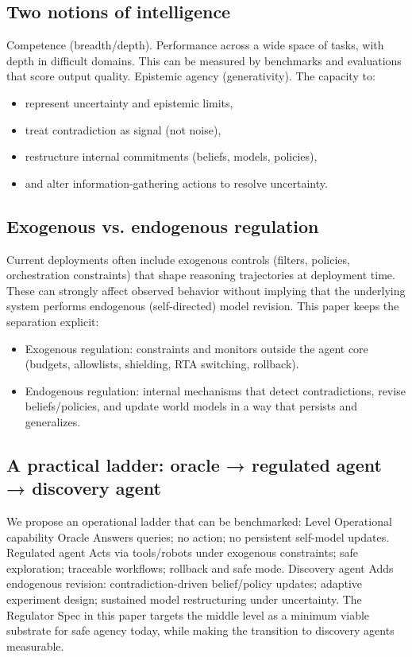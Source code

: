 \documentclass[11pt]{article}
\begin{document}
\subsection{Two notions of intelligence}
Competence (breadth/depth). Performance across a wide space of tasks, with depth in difficult
domains. This can be measured by benchmarks and evaluations that score output quality.
Epistemic agency (generativity). The capacity to:
\begin{itemize}
\item 
represent uncertainty and epistemic limits,
\item 
treat contradiction as signal (not noise),
\item 
restructure internal commitments (beliefs, models, policies),
\item 
and alter information-gathering actions to resolve uncertainty.
\end{itemize}
\subsection{Exogenous vs. endogenous regulation}
Current deployments often include exogenous controls (filters, policies, orchestration constraints)
that shape reasoning trajectories at deployment time. These can strongly affect observed behavior
without implying that the underlying system performs endogenous (self-directed) model revision.
This paper keeps the separation explicit:
\begin{itemize}
\item 
Exogenous regulation: constraints and monitors outside the agent core (budgets, allowlists,
shielding, RTA switching, rollback).
\item 
Endogenous regulation: internal mechanisms that detect contradictions, revise beliefs/policies,
and update world models in a way that persists and generalizes.
\end{itemize}
\subsection{A practical ladder: oracle → regulated agent → discovery agent}
We propose an operational ladder that can be benchmarked:
Level Operational capability
Oracle Answers queries; no action; no persistent self-model updates.
Regulated agent Acts via tools/robots under exogenous constraints; safe exploration; traceable
workflows; rollback and safe mode.
Discovery agent Adds endogenous revision: contradiction-driven belief/policy updates; adaptive experiment design; sustained model restructuring under uncertainty.
The Regulator Spec in this paper targets the middle level as a minimum viable substrate for
safe agency today, while making the transition to discovery agents measurable.
\end{document}
